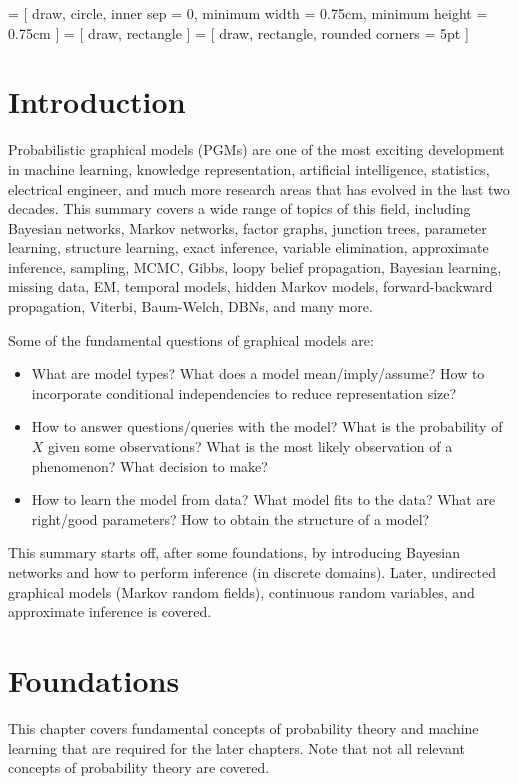  = [
draw,
circle,
inner sep = 0,
minimum width = 0.75cm,
minimum height = 0.75cm
]
 = [
draw,
rectangle
]
 = [
draw,
rectangle,
rounded corners = 5pt
]

\chapter{Introduction}
	Probabilistic graphical models (PGMs) are one of the most exciting development in machine learning, knowledge representation, artificial intelligence, statistics, electrical engineer, and much more research areas that has evolved in the last two decades. This summary covers a wide range of topics of this field, including Bayesian networks, Markov networks, factor graphs, junction trees, parameter learning, structure learning, exact inference, variable elimination, approximate inference, sampling, MCMC, Gibbs, loopy belief propagation, Bayesian learning, missing data, EM, temporal models, hidden Markov models, forward-backward propagation, Viterbi, Baum-Welch, DBNs, and many more.

	Some of the fundamental questions of graphical models are:
	\begin{itemize}
		\item {} What are model types? What does a model mean/imply/assume? How to incorporate conditional independencies to reduce representation size?
		\item {}      How to answer questions/queries with the model? What is the probability of \(X\) given some observations? What is the most likely observation of a phenomenon? What decision to make?
		\item {}       How to learn the model from data? What model fits to the data? What are right/good parameters? How to obtain the structure of a model?
	\end{itemize}
	This summary starts off, after some foundations, by introducing Bayesian networks and how to perform inference (in discrete domains). Later, undirected graphical models (Markov random fields), continuous random variables, and approximate inference is covered.

\chapter{Foundations}
	This chapter covers fundamental concepts of probability theory and machine learning that are required for the later chapters. Note that not all relevant concepts of probability theory are covered.

